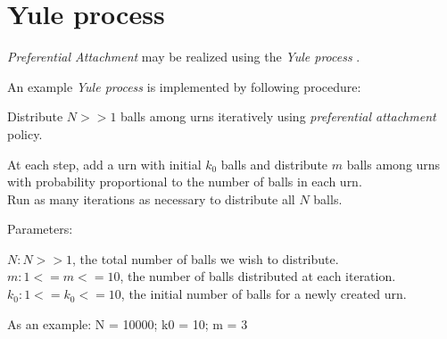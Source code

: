 \documentclass[a4paper, 12pt]{report}
\begin{document}
\pagebreak
\section{Yule process}
\par \textit{Preferential Attachment} may be realized using the \textit{Yule process}  \cite{yule-simon-distribution}.

\par An example \textit{Yule process} is implemented by following procedure:
\par Distribute $N >> 1$ balls among urns iteratively using \textit{preferential attachment} policy.

At each step, add a urn with initial $k_0$ balls and distribute $m$ balls among urns with probability proportional to the number of balls in each urn.\\
Run as many iterations as necessary to distribute all $N$ balls.

\par Parameters:
\begin{addmargin}[1cm]{1cm}%
    $N: N >> 1$, the total number of balls we wish to distribute.\\
    $m: 1 <= m <= 10$, the number of balls distributed at each iteration.\\
    $k_0: 1 <= k_0 <= 10$, the initial number of balls for a newly created urn.
\end{addmargin}

{\selectfont
As an example: N = 10000; k0 = 10; m = 3
}
\end{document}
